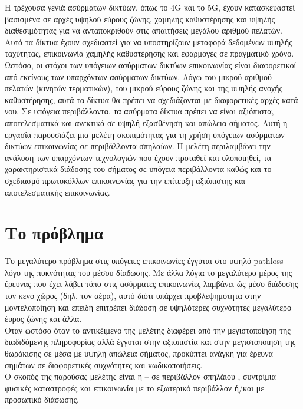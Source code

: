 \documentclass[12pt]{article}
\begin{document}
\begin{multicols*}{2}
        Η τρέχουσα γενιά ασύρματων δικτύων, όπως το 4G και το 5G, έχουν κατασκευαστεί βασισμένα σε αρχές υψηλού εύρους ζώνης, χαμηλής καθυστέρησης και υψηλής
        διαθεσιμότητας για να ανταποκριθούν στις απαιτήσεις μεγάλου αριθμού πελατών. Αυτά τα δίκτυα έχουν σχεδιαστεί για να υποστηρίζουν μεταφορά δεδομένων
        υψηλής ταχύτητας, επικοινωνία χαμηλής καθυστέρησης και εφαρμογές σε πραγματικό χρόνο.
        Ωστόσο, οι στόχοι των υπόγειων ασύρματων δικτύων επικοινωνίας είναι διαφορετικοί από εκείνους των υπαρχόντων ασύρματων δικτύων. Λόγω του μικρού αριθμού
        πελατών (κινητών τερματικών), του μικρού εύρους ζώνης και της υψηλής ανοχής καθυστέρησης, αυτά τα δίκτυα θα πρέπει να σχεδιάζονται με διαφορετικές αρχές
        κατά νου. Σε υπόγεια περιβάλλοντα, τα ασύρματα δίκτυα πρέπει να είναι αξιόπιστα, αποτελεσματικά και ανεκτικά σε υψηλή εξασθένηση και απώλεια σήματος.
        Αυτή η εργασία παρουσιάζει μια μελέτη σκοπιμότητας για τη χρήση υπόγειων ασύρματων δικτύων επικοινωνίας σε περιβάλλοντα σπηλαίων. Η μελέτη περιλαμβάνει
        την ανάλυση των υπαρχόντων τεχνολογιών που έχουν προταθεί και υλοποιηθεί, τα χαρακτηριστικά διάδοσης του σήματος σε υπόγεια περιβάλλοντα καθώς και το
        σχεδιασμό πρωτοκόλλων επικοινωνίας για την επίτευξη αξιόπιστης και αποτελεσματικής επικοινωνίας.

    \section{\normalsize \textsf{Το πρόβλημα}}
        Το μεγαλύτερο πρόβλημα στις υπόγειες επικοινωνίες έγγυται στο υψηλό pathloss λόγο της πυκνότητας του μέσου δίαδωσης. Με άλλα λόγια το μεγαλύτερο μέρος της 
        έρευνας που έχει λάβει τόπο στις ασύρματες επικοινωνίες λαμβάνει ώς μέσο διάδοσης τον κενό χώρος (δηλ. τον αέρα), αυτό διότι υπάρχει προβλεψημότητα στην
        μοντελοποίηση και επειδή επιτρέπει διάδοση σε υψηλότερες συχνότητες μεγαλύτερο έυρος ζώνης και άλλα.\\
        Όταν ωστόσο όταν το αντικέιμενο της μελέτης διαφέρει από την μεγιστοποίηση της διαδιδόμενης πληροφορίας αλλά έγγυται στην αξιοπιστία και στην μεγιστοποιηση
        της θωράκισης σε μέσα με υψηλή απώλεια σήματος, προκύπτει ανάγκη για έρευνα σημάτων σε διαφορετικές συχνότητες και κωδικοποιήσεις.\\
        Ο σκοπός της παρούσας μελέτης είναι η -- σε περιβάλλον σπηλάιου , συντρίμια φυσικές καταστροφές και επικοινωνία με το εξωτερικό περιβάλλον ή/και με προσωπικό
        διάσωσης.


\end{multicols*}
\end{document}
